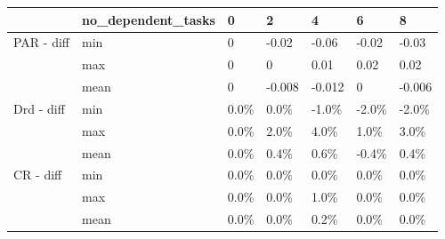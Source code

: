 \begin{tabular}{lllllll}
\toprule
          & no\_dependent\_tasks &     0 &      2 &      4 &      6 &      8 \\
\midrule
PAR - diff & min &     0 &  -0.02 &  -0.06 &  -0.02 &  -0.03 \\
          & max &     0 &      0 &   0.01 &   0.02 &   0.02 \\
          & mean &     0 & -0.008 & -0.012 &      0 & -0.006 \\
Drd - diff & min &  0.0\% &   0.0\% &  -1.0\% &  -2.0\% &  -2.0\% \\
          & max &  0.0\% &   2.0\% &   4.0\% &   1.0\% &   3.0\% \\
          & mean &  0.0\% &   0.4\% &   0.6\% &  -0.4\% &   0.4\% \\
CR - diff & min &  0.0\% &   0.0\% &   0.0\% &   0.0\% &   0.0\% \\
          & max &  0.0\% &   0.0\% &   1.0\% &   0.0\% &   0.0\% \\
          & mean &  0.0\% &   0.0\% &   0.2\% &   0.0\% &   0.0\% \\
\bottomrule
\end{tabular}

